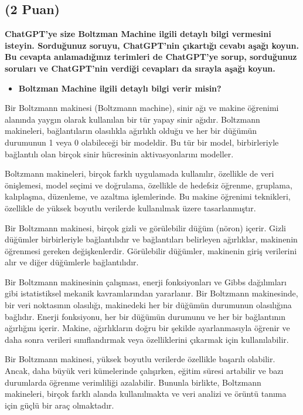 \documentclass[11pt]{article}
\begin{document}
\subsection{(2 Puan)} \textbf{ChatGPT’ye size Boltzman Machine ilgili detaylı bilgi vermesini isteyin. Sorduğunuz soruyu, ChatGPT'nin çıkartığı cevabı aşağı koyun. Bu cevapta anlamadığınız terimleri de ChatGPT’ye sorup, sorduğunuz soruları ve ChatGPT’nin verdiği cevapları da sırayla aşağı koyun.}

\begin{itemize}
    \item \textbf{Boltzman Machine ilgili detaylı bilgi verir misin?}
\end{itemize}
Bir Boltzmann makinesi (Boltzmann machine), sinir ağı ve makine öğrenimi alanında yaygın olarak kullanılan bir tür yapay sinir ağıdır. Boltzmann makineleri, bağlantıların olasılıkla ağırlıklı olduğu ve her bir düğümün durumunun 1 veya 0 olabileceği bir modeldir. Bu tür bir model, birbirleriyle bağlantılı olan birçok sinir hücresinin aktivasyonlarını modeller.

Boltzmann makineleri, birçok farklı uygulamada kullanılır, özellikle de veri önişlemesi, model seçimi ve doğrulama, özellikle de hedefsiz öğrenme, gruplama, kalıplaşma, düzenleme, ve azaltma işlemlerinde. Bu makine öğrenimi teknikleri, özellikle de yüksek boyutlu verilerde kullanılmak üzere tasarlanmıştır.

Bir Boltzmann makinesi, birçok gizli ve görülebilir düğüm (nöron) içerir. Gizli düğümler birbirleriyle bağlantılıdır ve bağlantıları belirleyen ağırlıklar, makinenin öğrenmesi gereken değişkenlerdir. Görülebilir düğümler, makinenin giriş verilerini alır ve diğer düğümlerle bağlantılıdır.

Bir Boltzmann makinesinin çalışması, enerji fonksiyonları ve Gibbs dağılımları gibi istatistiksel mekanik kavramlarından yararlanır. Bir Boltzmann makinesinde, bir veri noktasının olasılığı, makinedeki her bir düğümün durumunun olasılığına bağlıdır. Enerji fonksiyonu, her bir düğümün durumunu ve her bir bağlantının ağırlığını içerir. Makine, ağırlıkların doğru bir şekilde ayarlanmasıyla öğrenir ve daha sonra verileri sınıflandırmak veya özelliklerini çıkarmak için kullanılabilir.

Bir Boltzmann makinesi, yüksek boyutlu verilerde özellikle başarılı olabilir. Ancak, daha büyük veri kümelerinde çalışırken, eğitim süresi artabilir ve bazı durumlarda öğrenme verimliliği azalabilir. Bununla birlikte, Boltzmann makineleri, birçok farklı alanda kullanılmakta ve veri analizi ve örüntü tanıma için güçlü bir araç olmaktadır.
\end{document}
